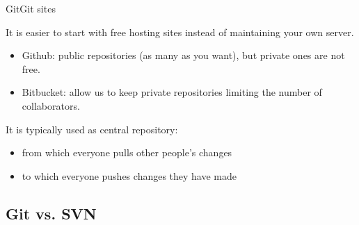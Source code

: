 \documentclass[10pt,compress]{beamer} %
\begin{document}
\begin{frame}{Git}{Git sites}


It is easier to start with free hosting sites instead of maintaining your own server.

\begin{itemize}
 \item \alert{Github}: public repositories (as many as you want), but private ones are not free.
 \item \alert{Bitbucket}: allow us to keep private repositories limiting the number of collaborators.
\end{itemize}

It is typically used as central repository:
\begin{itemize}
 \item from which everyone pulls other people’s changes
 \item to which everyone pushes changes they have made
\end{itemize}

\end{frame}

\subsection{Git vs. SVN}
\end{document}
